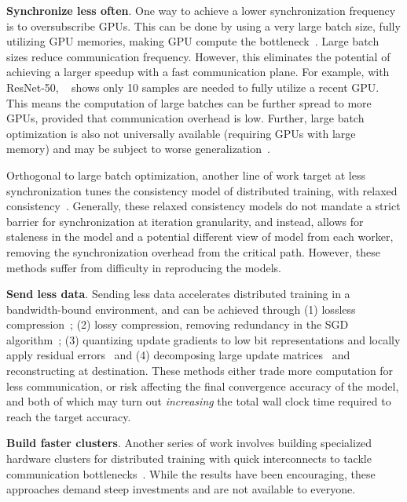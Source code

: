 \noindent\textbf{Synchronize less often}. One way to achieve a lower synchronization frequency is to oversubscribe GPUs. This can be done by using a very large batch size, fully utilizing GPU memories, making GPU compute the bottleneck~\cite{Nowanyon13:online, ImageNetIn1Hour, sridharan2018scaleout, jia2018highly}. Large batch sizes reduce communication frequency. However, this eliminates the potential of achieving a larger speedup with a fast communication plane. For example, with ResNet-50, ~\cite{Shen2018NexusA} shows only 10 samples are needed to fully utilize a recent GPU. This means the computation of large batches can be further spread to more GPUs, provided that communication overhead is low. Further, large batch optimization is also not universally available (requiring GPUs with large memory) and may be subject to worse generalization~\cite{keskar2016large}.

Orthogonal to large batch optimization, another line of work target at less synchronization tunes the consistency model of distributed training, with relaxed consistency~\cite{DBLP:journals/corr/DaiKWHGX14,SSP,BSP,Wei:2015:MCC:2806777.2806778,Litz,xie2018orpheus,wang2018adaptive}. Generally, these relaxed consistency models do not mandate a strict barrier for synchronization at iteration granularity, and instead, allows for staleness in the model and a potential different view of model from each worker, removing the synchronization overhead from the critical path. However, these methods suffer from difficulty in reproducing the models. 

\noindent\textbf{Send less data}. Sending less data accelerates distributed training in a bandwidth-bound environment, and can be achieved through (1) lossless compression~\cite{burtscher2009fpc}; (2) lossy compression, removing redundancy in the SGD algorithm~\cite{lin2017deep}; (3) quantizing update gradients to low bit representations and locally apply residual errors~\cite{cntk1bt, lim20183lc} and (4) decomposing large update matrices~\cite{projectAdam,poseidon,xie2015distributed} and reconstructing at destination. These methods either trade more computation for less communication, or risk affecting the final convergence accuracy of the model, and both of which may turn out \textit{increasing} the total wall clock time required to reach the target accuracy.

\noindent\textbf{Build faster clusters}. Another series of work involves building specialized hardware clusters for distributed training with quick interconnects to tackle communication bottlenecks~\cite{DBLP:journals/corr/abs-1711-00489, You:2018:ITM:3225058.3225069, DBLP:journals/corr/abs-1711-04325,jia2018highly,DBLP:journals/corr/abs-1811-05233,sun2019optimizing, ImageNetIn1Hour, firecaffe}. While the results have been encouraging, these approaches demand steep investments and are not available to everyone.

